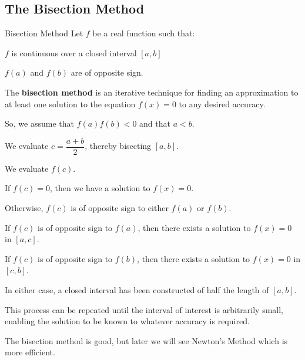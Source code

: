 \subsection{The Bisection Method}
\begin{Definition}{Bisection Method}{}
    Let $ f $ be a real function such that:
    \begin{description}
        \item $ f $ is continuous over a closed interval $ [a,b] $
        \item $ f(a) $ and $ f(b) $ are of opposite sign.\bigskip
    \end{description}
    The \textbf{bisection method} is an iterative technique for finding an approximation to at
    least one solution to the equation $f(x)=0$ to any desired accuracy.\bigskip

    So, we assume that $ f(a)f(b)<0 $ and that $ a<b $.

    \begin{description}
        \item We evaluate $ c=\dfrac{a+b}{2} $, thereby bisecting $ [a,b] $.
        \item We evaluate $ f(c) $.
        \item If $ f(c)=0 $, then we have a solution to $ f(x)=0 $.
        \item Otherwise, $ f(c) $ is of opposite sign to either $ f(a) $ or $ f(b) $.
              \begin{description}
                  \item If $ f(c) $ is of opposite sign to $ f(a) $, then there exists a solution to $ f(x)=0 $ in $ [a,c] $.
                  \item If $ f(c) $ is of opposite sign to $ f(b) $, then there exists a solution to $ f(x)=0 $ in $ [c,b] $.
              \end{description}
              In either case, a closed interval has been constructed of half the length of $ [a,b] $.
    \end{description}

    \bigskip
    This process can be repeated until the interval of interest is arbitrarily small, enabling the solution to be known to whatever accuracy is required.
\end{Definition}
\begin{Remark}{}{}
    The bisection method is good, but later we will see Newton's Method which is more efficient.
\end{Remark}
